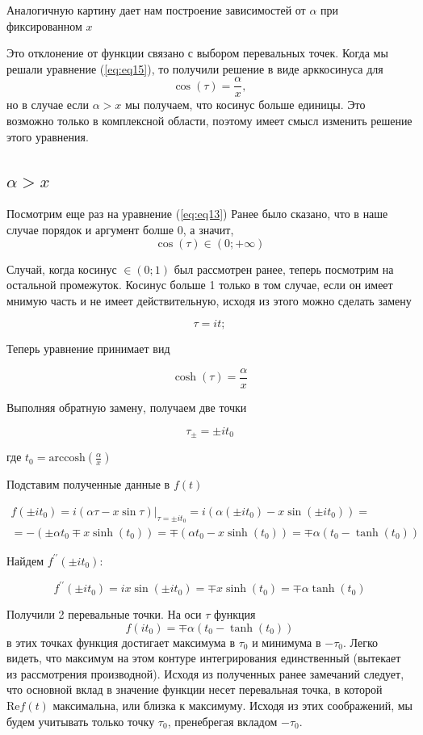 \documentclass[14pt]{extarticle}
\renewcommand{\Re}{\mathrm{Re}}
\newcommand{\arccosh}{\mathrm{arccosh}}
\begin{document}
Аналогичную картину дает нам построение зависимостей от $\alpha$ при фиксированном $x$

Это отклонение от функции связано с выбором перевальных точек. Когда мы решали уравнение (\ref{eq:eq15}), то получили решение в виде арккосинуса для
$$
\cos(\tau)=\frac{\alpha}{x},
$$
но в случае если $\alpha>x$ мы получаем, что косинус больше единицы. Это возможно только в комплексной области, поэтому имеет смысл изменить решение этого уравнения.\cite{Wong}

\subsection{$\alpha>x$}

Посмотрим еще раз на уравнение (\ref{eq:eq13})
Ранее было сказано, что в наше случае порядок и аргумент болше 0, а значит, 
$$
\cos(\tau) \in (0;+\infty)
$$

Случай, когда косинус $\in (0; 1)$ был рассмотрен ранее, теперь посмотрим на остальной промежуток.
Косинус больше 1 только в том случае, если он имеет мнимую часть и не имеет действительную, исходя из этого можно сделать замену

$$
\tau = i t;
$$

Теперь уравнение принимает вид

$$
\cosh (\tau) = \frac{\alpha}{x}
$$

Выполняя обратную замену, получаем две точки 

$$
\tau_{\pm} = \pm i t_0
$$

где $t_0 = \arccosh \left(\frac{\alpha}{x}\right)$

Подставим полученные данные в $f(t)$

\begin{eqnarray}\nonumber 
f(\pm i t_0) = i (\alpha \tau - x \sin \tau) |_{\tau=\pm i t_0} = i (\alpha (\pm i t_0) - x \sin (\pm i t_0)) = \\
\nonumber= -(\pm \alpha t_0 \mp x \sinh(t_0)) = \mp(\alpha t_0 - x \sinh(t_0)) = \mp\alpha(t_0 - \tanh(t_0))
\end{eqnarray}

Найдем $f^{\prime \prime}(\pm i t{_0})$:

\begin{equation}\nonumber 
f^{\prime \prime}(\pm i t{_0}) = i x \sin (\pm i t_0) = \mp x \sinh (t{_0}) = \mp\alpha\tanh(t_0)
\end{equation}

Получили 2 перевальные точки. На оси $\tau$ функция 
$$
f(i t_0) = \mp \alpha (t_0 - \tanh(t_0))
$$
в этих точках функция достигает максимума в $\tau_0$ и минимума в $-\tau_0$. Легко видеть, что максимум на этом контуре интегрирования единственный (вытекает из рассмотрения производной). Исходя из полученных ранее замечаний следует, что основной вклад в значение функции несет перевальная точка, в которой $\Re f(t)$ максимальна, или близка к максимуму. Исходя из этих соображений, мы будем учитывать только точку $\tau_0$, пренебрегая вкладом $-\tau_0$.
\end{document}
